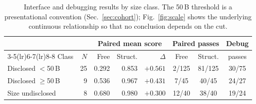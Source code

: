 \begin{table}[t]
\centering\small
\caption{Interface and debugging results by size class. The 50\,B threshold is a
presentational convention (Sec.~\ref{sec:cohort}); Fig.~\ref{fig:scale} shows the underlying
continuous relationship so that no conclusion depends on the cut.}
\label{tab:sizeclass}
\begin{tabular}{lrrrrccc}
\toprule
& & \multicolumn{3}{c}{Paired mean score} & \multicolumn{2}{c}{Paired passes} & Debug \\
\cmidrule(lr){3-5}\cmidrule(lr){6-7}\cmidrule(lr){8-8}
Class & $N$ & Free & Struct. & $\Delta$ & Free & Struct. & passes \\
\midrule
Disclosed $<$50\,B & 25 & 0.292 & 0.853 & $+0.561$ & 2/125 & 81/125 & 30/75 \\
Disclosed $\geq$50\,B & 9 & 0.536 & 0.967 & $+0.431$ & 7/45 & 40/45 & 24/27 \\
Size undisclosed & 8 & 0.680 & 0.980 & $+0.300$ & 12/40 & 38/40 & 19/24 \\
\bottomrule
\end{tabular}
\end{table}
